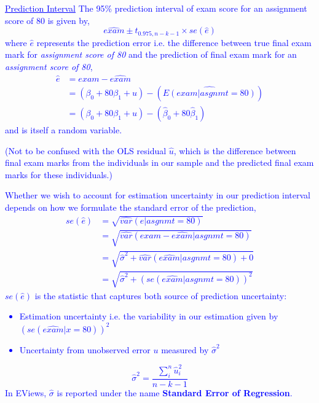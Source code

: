 \documentclass[12pt]{report}
\newenvironment{blueframed}[1][blue]
{\def\FrameCommand{\fboxsep=\FrameSep\fcolorbox{#1}{white}}%
	\MakeFramed {\advance\hsize-\width \FrameRestore}}
{\endMakeFramed}
\begin{document}
\newpage
\justify
\begin{blueframed}
	\textcolor{blue}{\underline{Prediction Interval}}
	\vspace{-\baselineskip}
	\justify
	\noindent \textcolor{blue}
	{
		The 95\% prediction interval of exam score for an assignment score of 80 is given by,
		$$\widehat{exam} \pm t_{0.975,n-k-1} \times se(\hat{e})$$
		where $\hat{e}$ represents the prediction error i.e. the difference between true final exam mark for \textit{assignment score of 80} and the prediction of final exam mark for an \textit{assignment score of 80},
		\begin{align*}
		\hat{e} &= exam - \widehat{exam} \\
		&= (\beta_0 + 80\beta_1 + u) - (\widehat{E(exam|asgnmt=80)}) \\
		&= (\beta_0 + 80\beta_1 + u) - (\hat{\beta}_0 + 80\hat{\beta}_1)
		\end{align*}
		and is itself a random variable.
	}
	
	\noindent \textcolor{blue}
	{
		(Not to be confused with the OLS residual $\hat{u}$, which is the difference between final exam marks from the individuals in our sample and the predicted final exam marks for these individuals.)
	}
	
	\noindent \textcolor{blue}
	{
		Whether we wish to account for estimation uncertainty in our prediction interval depends on how we formulate the standard error of the prediction,
		\begin{align*}
		se(\hat{e}) &= \sqrt{\widehat{var}({\hat{e}|asgnmt=80})} \\
		&= \sqrt{\widehat{var}({exam-\hat{exam}|asgnmt=80})} \\
		&= \sqrt{\hat{\sigma}^2 + \widehat{var}({\hat{exam}|asgnmt=80}) + 0} \\
		&= \sqrt{\hat{\sigma}^2 + (se(\hat{exam}|asgnmt=80))^2}
		\end{align*}
		$se(\hat{e})$ is the statistic that captures both source of prediction uncertainty: \begin{itemize}
			\item Estimation uncertainty i.e. the variability in our estimation given by $(se(\hat{exam}|x=80))^2$
			\item Uncertainty from  unobserved error $u$ measured by $\hat{\sigma}^2$
		\end{itemize} $$\hat{\sigma}^2 = \dfrac{\sum_{i}^{n}\hat{u}_{i}^{2}}{n-k-1}$$
	In EViews, $\hat{\sigma}$ is reported under the name \textbf{Standard Error of Regression}.
	}
\end{blueframed} 
\end{document}
